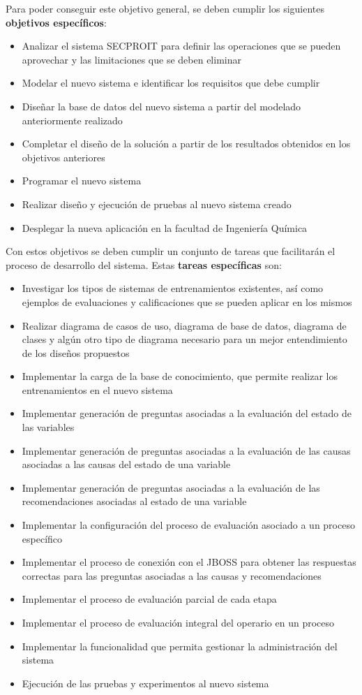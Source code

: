 Para poder conseguir este objetivo general, se deben cumplir los siguientes \textbf{objetivos específicos}:
\begin{itemize}
\item Analizar el sistema SECPROIT para definir las operaciones que se pueden aprovechar y las limitaciones que se deben eliminar
\item Modelar el nuevo sistema e identificar los requisitos que debe cumplir
\item Diseñar la base de datos del nuevo sistema a partir del modelado anteriormente realizado
\item Completar el diseño de la solución a partir de los resultados obtenidos en los objetivos anteriores
\item Programar el nuevo sistema
\item Realizar diseño y ejecución de pruebas al nuevo sistema creado
\item Desplegar la nueva aplicación en la facultad de Ingeniería Química
\end{itemize}

Con estos objetivos se deben cumplir un conjunto de tareas que facilitarán el proceso de desarrollo del sistema. Estas \textbf{tareas específicas} son:
\begin{itemize}
\item Investigar los tipos de sistemas de entrenamientos existentes, así como ejemplos de evaluaciones y calificaciones que se pueden aplicar en los mismos
\item Realizar diagrama de casos de uso, diagrama de base de datos, diagrama de clases y algún otro tipo de diagrama necesario para un mejor entendimiento de los diseños propuestos
\item Implementar la carga de la base de conocimiento, que permite realizar los entrenamientos en el nuevo sistema
\item Implementar generación de preguntas asociadas a la evaluación del estado de las variables
\item Implementar generación de preguntas asociadas a la evaluación de las causas asociadas a las causas del estado de una variable
\item Implementar generación de preguntas asociadas a la evaluación de las recomendaciones asociadas al estado de una variable
\item Implementar la configuración del proceso de evaluación asociado a un proceso específico
\item Implementar el proceso de conexión con el JBOSS para obtener las respuestas correctas para las preguntas asociadas a las causas y recomendaciones
\item Implementar el proceso de evaluación parcial de cada etapa
\item Implementar el proceso de evaluación integral del operario en un proceso
\item Implementar la funcionalidad que permita gestionar la administración del sistema
\item Ejecución de las pruebas y experimentos al nuevo sistema
\end{itemize}

